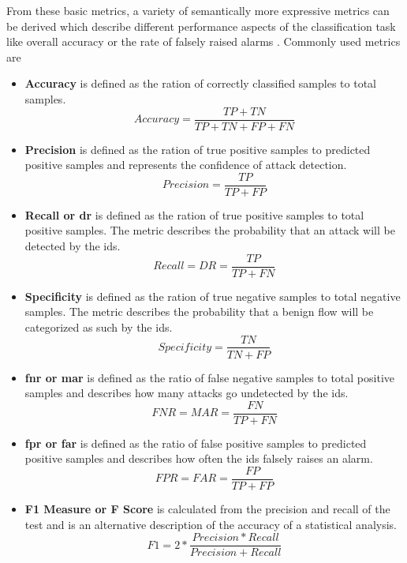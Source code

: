 From these basic metrics, a variety of semantically more expressive metrics can be derived which describe different performance aspects of the classification task like overall accuracy or the rate of falsely raised alarms \cite{confusion_matrix}. Commonly used metrics are 

\begin{itemize}
	\item \textbf{Accuracy} is defined as the ration of correctly classified samples to total samples. \begin{equation}
	Accuracy = \frac{TP + TN}{TP + TN + FP + FN}
	\end{equation}
	
	\item \textbf{Precision} is defined as the ration of true positive samples to predicted positive samples and represents the confidence of attack detection.
	 \begin{equation}
	Precision = \frac{TP}{TP + FP}
	\end{equation}
	
	\item \textbf{Recall or \gls{dr}} is defined as the ration of true positive samples to total positive samples. The metric describes the probability that an attack will be detected by the \gls{ids}.
	\begin{equation}
	Recall = DR = \frac{TP}{TP + FN}
	\end{equation}
	
	\item \textbf{Specificity} is defined as the ration of true negative samples to total negative samples. The metric describes the probability that a benign flow will be categorized as such by the \gls{ids}.
	\begin{equation}
	Specificity = \frac{TN}{TN + FP}
	\end{equation}
	
	\item \textbf{\gls{fnr} or \gls{mar}} is defined as the ratio of false negative samples to total positive samples and describes how many attacks go undetected by the \gls{ids}.
	\begin{equation}
	FNR = MAR = \frac{FN}{TP + FN}
	\end{equation}
	
	\item \textbf{\gls{fpr} or \gls{far}} is defined as the ratio of false positive samples to predicted positive samples and describes how often the \gls{ids} falsely raises an alarm.
	\begin{equation}
	FPR = FAR = \frac{FP}{TP + FP}
	\end{equation}
	
	\item \textbf{F1 Measure or F Score} is calculated from the precision and recall of the test and is an alternative description of the accuracy of a statistical analysis.
	\begin{equation}
	F1 = 2*\frac{Precision * Recall}{Precision + Recall}
	\end{equation}
\end{itemize}


\printglossaries
